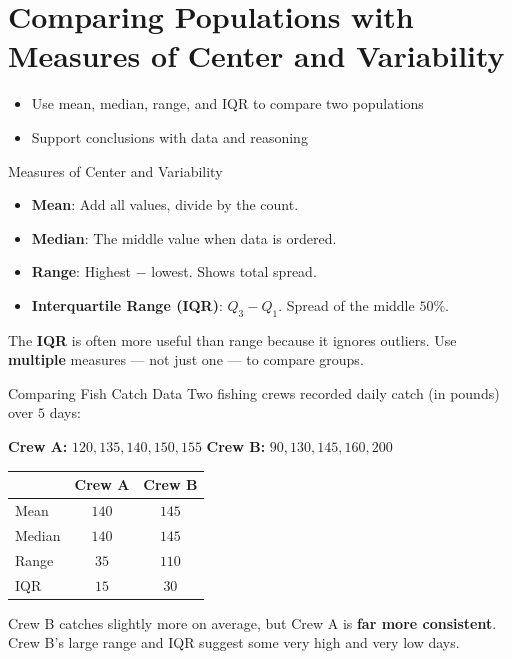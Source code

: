 \section{Comparing Populations with Measures of Center and Variability}

\begin{learningGoals}
\begin{itemize}
    \item Use mean, median, range, and IQR to compare two populations
    \item Support conclusions with data and reasoning
\end{itemize}
\end{learningGoals}

\begin{conceptBox}{Measures of Center and Variability}
\begin{itemize}[leftmargin=*]
    \item \textbf{Mean}: Add all values, divide by the count.
    \item \textbf{Median}: The middle value when data is ordered.
    \item \textbf{Range}: Highest $-$ lowest. Shows total spread.
    \item \textbf{Interquartile Range (IQR)}: $Q_3 - Q_1$. Spread of the middle $50\%$.
\end{itemize}
The \textbf{IQR} is often more useful than range because it ignores outliers. Use \textbf{multiple} measures — not just one — to compare groups.
\end{conceptBox}

\begin{workedExample}{Comparing Fish Catch Data}
Two fishing crews recorded daily catch (in pounds) over $5$ days:

\textbf{Crew A:} $120, 135, 140, 150, 155$ \quad \textbf{Crew B:} $90, 130, 145, 160, 200$

\begin{center}
\begin{tabular}{l c c}
 & \textbf{Crew A} & \textbf{Crew B} \\
\hline
Mean & $140$ & $145$ \\
Median & $140$ & $145$ \\
Range & $35$ & $110$ \\
IQR & $15$ & $30$ \\
\end{tabular}
\end{center}

Crew B catches slightly more on average, but Crew A is \textbf{far more consistent}. Crew B's large range and IQR suggest some very high and very low days.
\end{workedExample}

